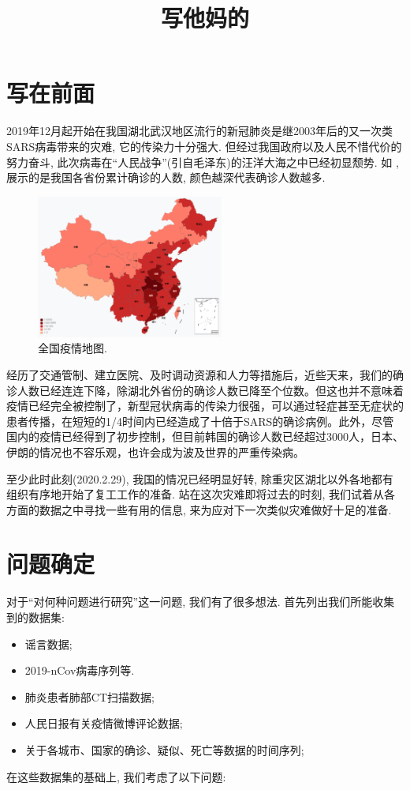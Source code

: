 \documentclass[lang=cn,11pt]{elegantpaper}
\title{写他妈的}
\date{}
\begin{document}
\section{写在前面}
2019年12月起开始在我国湖北武汉地区流行的新冠肺炎是继2003年后的又一次类SARS病毒带来的灾难, 它的传染力十分强大. 但经过我国政府以及人民不惜代价的努力奋斗, 此次病毒在“人民战争”(引自毛泽东)的汪洋大海之中已经初显颓势. 如 , 展示的是我国各省份累计确诊的人数, 颜色越深代表确诊人数越多.
\begin{figure}[htbp]
  \centering
  \includegraphics[width=0.55\textwidth]{map}
  \caption{全国疫情地图. \label{fig:map}}
\end{figure}
经历了交通管制、建立医院、及时调动资源和人力等措施后，近些天来，我们的确诊人数已经连连下降，除湖北外省份的确诊人数已降至个位数。但这也并不意味着疫情已经完全被控制了，新型冠状病毒的传染力很强，可以通过轻症甚至无症状的患者传播，在短短的1/4时间内已经造成了十倍于SARS的确诊病例。此外，尽管国内的疫情已经得到了初步控制，但目前韩国的确诊人数已经超过3000人，日本、伊朗的情况也不容乐观，也许会成为波及世界的严重传染病。

至少此时此刻(2020.2.29), 我国的情况已经明显好转, 除重灾区湖北以外各地都有组织有序地开始了复工工作的准备. 站在这次灾难即将过去的时刻, 我们试着从各方面的数据之中寻找一些有用的信息, 来为应对下一次类似灾难做好十足的准备. 

\section{问题确定}
对于“对何种问题进行研究”这一问题, 我们有了很多想法. 首先列出我们所能收集到的数据集: 
\begin{center}
  \begin{itemize}
    \item 谣言数据;
    \item 2019-nCov病毒序列等.
    \item 肺炎患者肺部CT扫描数据;
    \item 人民日报有关疫情微博评论数据;
    \item 关于各城市、国家的确诊、疑似、死亡等数据的时间序列; 
  \end{itemize}
\end{center}
在这些数据集的基础上, 我们考虑了以下问题:
\end{document}
